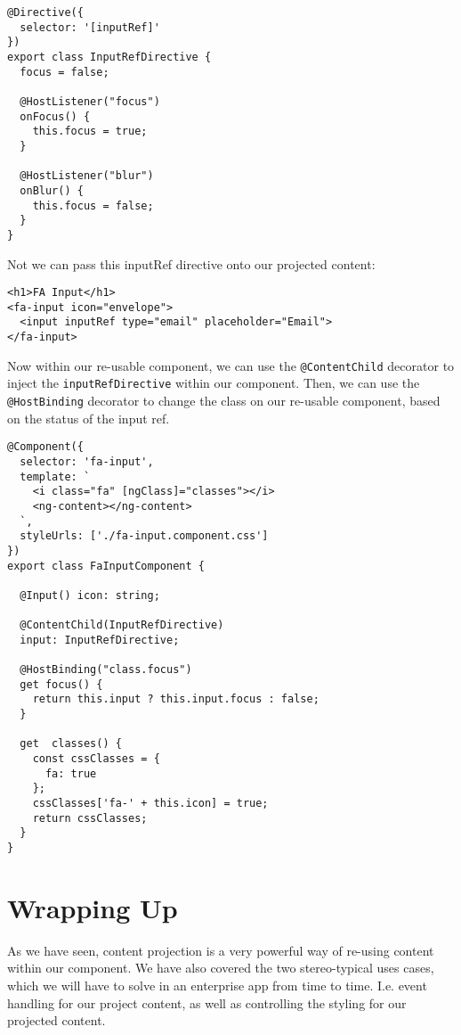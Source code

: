 \begin{lstlisting}
@Directive({
  selector: '[inputRef]'
})
export class InputRefDirective {
  focus = false;

  @HostListener("focus")
  onFocus() {
    this.focus = true;
  }

  @HostListener("blur")
  onBlur() {
    this.focus = false;
  }
}
\end{lstlisting}

Not we can pass this inputRef directive onto our projected content:
\begin{lstlisting}
<h1>FA Input</h1>
<fa-input icon="envelope">
  <input inputRef type="email" placeholder="Email">
</fa-input>
\end{lstlisting}

Now within our re-usable component, we can use the \lstinline{@ContentChild}
decorator to inject the \lstinline{inputRefDirective} within our component. Then,
we can use the \lstinline{@HostBinding} decorator to change the class on our
re-usable component, based on the status of the input ref.
\begin{lstlisting}
@Component({
  selector: 'fa-input',
  template: `
    <i class="fa" [ngClass]="classes"></i>
    <ng-content></ng-content>
  `,
  styleUrls: ['./fa-input.component.css']
})
export class FaInputComponent {

  @Input() icon: string;

  @ContentChild(InputRefDirective)
  input: InputRefDirective;

  @HostBinding("class.focus")
  get focus() {
    return this.input ? this.input.focus : false;
  }

  get  classes() {
    const cssClasses = {
      fa: true
    };
    cssClasses['fa-' + this.icon] = true;
    return cssClasses;
  }
}
\end{lstlisting}

\section{ Wrapping Up }
As we have seen, content projection is a very powerful way of re-using content
within our component. We have also covered the two stereo-typical uses cases,
which we will have to solve in an enterprise app from time to time. I.e. event
handling for our project content, as well as controlling the styling for our
projected content.

